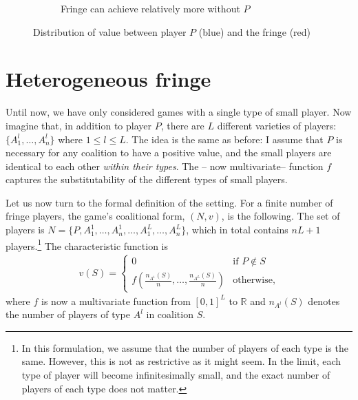 \begin{figure}
\begin{subfigure}[b]{0.45\textwidth}
        \caption{Fringe can achieve relatively more without $P$}
    \end{subfigure}
    \caption{Distribution of value between player $P$ (blue) and the fringe (red)}
    \label{fig:non_indispensable}
\end{figure}


\section{Heterogeneous fringe}
\label{sec:many_sided}

Until now, we have only considered games with a single type of small player.
Now imagine that, in addition to player $P$, there are $L$ different varieties of players: $\{A^l_1, \dots, A^l_n\}$ where $1 \leq l \leq L$.
The idea is the same as before: I assume that $P$ is necessary for any coalition to have a positive value, and the small players are identical to each other \emph{within their types}.
The -- now multivariate-- function $ f$ captures the substitutability of the different types of small players.

Let us now turn to the formal definition of the setting.
For a finite number of fringe players, the game's coalitional form, $(N, v)$, is the following.
The set of players is $N = \{P, A^1_1, \dots, A^1_n, \dots, A^L_1, \dots, A^L_n\}$, which in total contains $nL + 1$ players.\footnote{
 In this formulation, we assume that the number of players of each type is the same.
 However, this is not as restrictive as it might seem.
 In the limit, each type of player will become infinitesimally small, and the exact number of players of each type does not matter.
}
The characteristic function is
\begin{align*}
    v(S) = \begin{cases}
        0                                                & \text{if } P \notin S \\
        f\left(\frac{n_{A^1}(S)}{n}, \dots, \frac{n_{A^L}(S)}{n}\right) & \text{otherwise},
    \end{cases}
\end{align*}
where $f$ is now a multivariate function from $[0, 1]^L$ to $\mathbb{R}$ and $n_{A^l}(S)$ denotes the number of players of type $A^l$ in coalition $S$.

